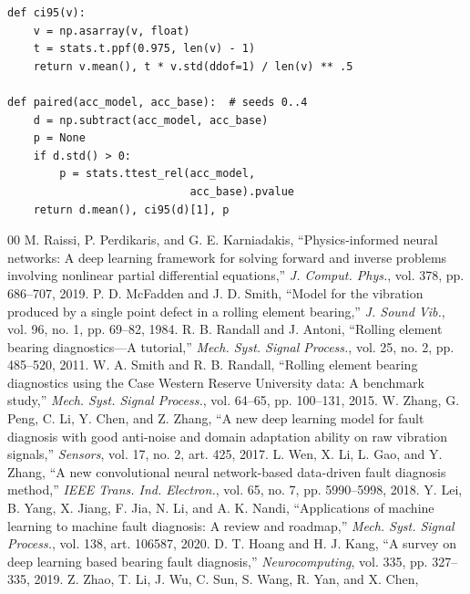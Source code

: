 \documentclass[conference]{IEEEtran}
\begin{document}
\begin{lstlisting}[caption={Statistics: 95\% CI and paired test against the baseline.},label={lst:stats}]
def ci95(v):
    v = np.asarray(v, float)
    t = stats.t.ppf(0.975, len(v) - 1)
    return v.mean(), t * v.std(ddof=1) / len(v) ** .5

def paired(acc_model, acc_base):  # seeds 0..4
    d = np.subtract(acc_model, acc_base)
    p = None
    if d.std() > 0:
        p = stats.ttest_rel(acc_model,
                            acc_base).pvalue
    return d.mean(), ci95(d)[1], p
\end{lstlisting}

\begin{thebibliography}{00}
 M. Raissi, P. Perdikaris, and G. E. Karniadakis,
``Physics-informed neural networks: A deep learning framework for solving
forward and inverse problems involving nonlinear partial differential
equations,'' \textit{J. Comput. Phys.}, vol. 378, pp. 686--707, 2019.
 P. D. McFadden and J. D. Smith, ``Model for the vibration
produced by a single point defect in a rolling element bearing,'' \textit{J.
Sound Vib.}, vol. 96, no. 1, pp. 69--82, 1984.
 R. B. Randall and J. Antoni, ``Rolling element bearing
diagnostics---A tutorial,'' \textit{Mech. Syst. Signal Process.}, vol. 25, no.
2, pp. 485--520, 2011.
 W. A. Smith and R. B. Randall, ``Rolling element bearing
diagnostics using the Case Western Reserve University data: A benchmark study,''
\textit{Mech. Syst. Signal Process.}, vol. 64--65, pp. 100--131, 2015.
 W. Zhang, G. Peng, C. Li, Y. Chen, and Z. Zhang, ``A new
deep learning model for fault diagnosis with good anti-noise and domain
adaptation ability on raw vibration signals,'' \textit{Sensors}, vol. 17, no. 2,
art. 425, 2017.
 L. Wen, X. Li, L. Gao, and Y. Zhang, ``A new convolutional
neural network-based data-driven fault diagnosis method,'' \textit{IEEE Trans.
Ind. Electron.}, vol. 65, no. 7, pp. 5990--5998, 2018.
 Y. Lei, B. Yang, X. Jiang, F. Jia, N. Li, and A. K. Nandi,
``Applications of machine learning to machine fault diagnosis: A review and
roadmap,'' \textit{Mech. Syst. Signal Process.}, vol. 138, art. 106587, 2020.
 D. T. Hoang and H. J. Kang, ``A survey on deep learning based
bearing fault diagnosis,'' \textit{Neurocomputing}, vol. 335, pp. 327--335,
2019.
 Z. Zhao, T. Li, J. Wu, C. Sun, S. Wang, R. Yan, and X. Chen,

\end{thebibliography}
\end{document}
